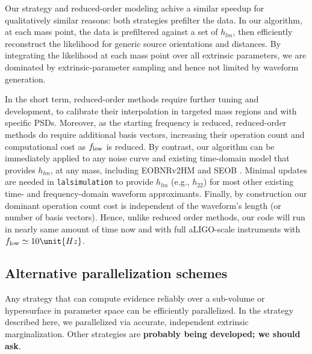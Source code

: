 Our strategy and reduced-order modeling achive a similar speedup for qualitatively similar reasons: both strategies
prefilter the data.   In our algorithm, at each mass point, the data is prefiltered  against a
set of $h_{lm}$, then efficiently reconstruct the likelihood for generic source orientations and distances.  
%
By integrating the likelihood at each mass point over all extrinsic parameters,  we are dominated by extrinsic-parameter
sampling and  hence not limited by waveform generation.

In the short term, reduced-order methods require further tuning and development, to calibrate their interpolation in
targeted mass regions and with specific PSDs.
Moreover, as the starting frequency is reduced, reduced-order methods do require additional basis vectors, increasing
their operation count and computational cost as $f_{\rm low}$ is reduced.
%
  By contrast,
our algorithm can be immediately applied to any noise curve and existing time-domain model that provides $h_{lm}$,  at any mass,
including EOBNRv2HM \cite{gw-astro-EOBNR-Calibrated-2009} and SEOB \cite{gw-astro-EOBspin-Tarrachini2012}.  Minimal
updates are  needed in \texttt{lalsimulation} to provide $h_{lm}$ (e.g., $h_{22}$) for most
other existing time- and frequency-domain waveform approximants.  
%
%
Finally, by construction our dominant operation count cost is  independent of the waveform's length (or number of basis
vectors).  Hence, unlike reduced order methods, our code will run in nearly same amount of time now and with full
aLIGO-scale instruments with $f_{\rm low}\simeq 10\unit{Hz}$.  


\subsection{Alternative parallelization schemes}
Any strategy that can compute evidence reliably over a sub-volume or hypersurface in parameter space
can be efficiently parallelized.   In the strategy described here, we parallelized via accurate, independent extrinsic marginalization.  
%
Other strategies are \textbf{probably being developed; we should ask}.
